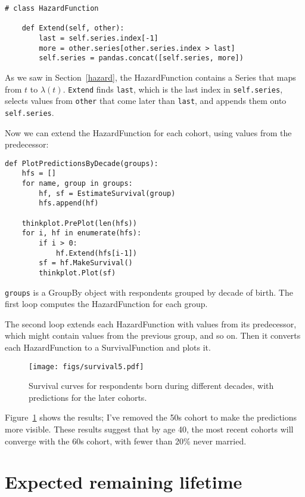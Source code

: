 \documentclass[12pt]{book}
\begin{document}
\begin{verbatim}
# class HazardFunction

    def Extend(self, other):
        last = self.series.index[-1]
        more = other.series[other.series.index > last]
        self.series = pandas.concat([self.series, more])
\end{verbatim}

As we saw in Section~\ref{hazard}, the HazardFunction contains a Series
that maps from $t$ to $\lambda(t)$.  {\tt Extend} finds {\tt last},
which is the last index in {\tt self.series}, selects values from
{\tt other} that come later than {\tt last}, and appends them
onto {\tt self.series}.

Now we can extend the HazardFunction for each cohort, using values
from the predecessor:

\begin{verbatim}
def PlotPredictionsByDecade(groups):
    hfs = []
    for name, group in groups:
        hf, sf = EstimateSurvival(group)
        hfs.append(hf)

    thinkplot.PrePlot(len(hfs))
    for i, hf in enumerate(hfs):
        if i > 0:
            hf.Extend(hfs[i-1])
        sf = hf.MakeSurvival()
        thinkplot.Plot(sf)
\end{verbatim}

{\tt groups} is a GroupBy object with respondents grouped by decade of
birth.  The first loop computes the HazardFunction for each group.

The second loop extends each HazardFunction with values from
its predecessor, which might contain values from the previous
group, and so on.  Then it converts each HazardFunction to
a SurvivalFunction and plots it.

\begin{figure}
\centerline{\texttt{[image: figs/survival5.pdf]}}
\caption{Survival curves for respondents born during different decades,
with predictions for the later cohorts.}
\label{survival5}
\end{figure}

Figure~\ref{survival5} shows the results; I've removed the 50s cohort
to make the predictions more visible.  These results suggest that by
age 40, the most recent cohorts will converge with the 60s cohort,
with fewer than 20\% never married.


\section{Expected remaining lifetime}
\end{document}
